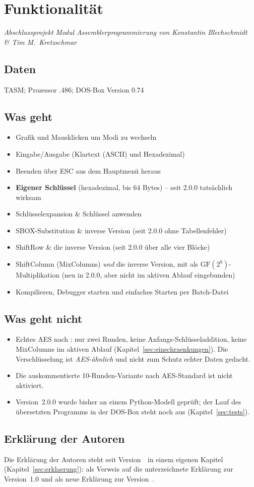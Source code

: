 \section{Funktionalität}\label{sec:funktionalitaet}
\textit{Abschlussprojekt Modul \glqq Assemblerprogrammierung\grqq{} von Konstantin Blechschmidt \& Tim M.\ Kretzschmar}

\subsection*{Daten}
TASM; Prozessor .486; DOS-Box Version 0.74

\subsection*{Was geht}
\begin{itemize}[noitemsep]
    \item Grafik und Mausklicken um Modi zu wechseln
    \item Eingabe/Ausgabe (Klartext (ASCII) und Hexadezimal)
    \item Beenden über \glqq ESC\grqq{} aus dem Hauptmenü heraus
    \item \textbf{Eigener Schlüssel} (hexadezimal, bis 64 Bytes) -- seit 2.0.0 tatsächlich wirksam
    \item Schlüsselexpansion \& Schlüssel anwenden
    \item SBOX-Substitution \& inverse Version (seit 2.0.0 ohne Tabellenfehler)
    \item ShiftRow \& die inverse Version (seit 2.0.0 über alle vier Blöcke)
    \item ShiftColumn (MixColumns) \emph{und} die inverse Version, mit  als $\mathrm{GF}(2^8)$-Multiplikation (neu in 2.0.0, aber nicht im aktiven Ablauf eingebunden)
    \item Kompilieren, Debugger starten und einfaches Starten per Batch-Datei
\end{itemize}

\subsection*{Was geht nicht}
\begin{itemize}[noitemsep]
    \item Echtes AES nach \cite{fips197}: nur zwei Runden, keine Anfangs-Schlüsseladdition, keine MixColumns im aktiven Ablauf (Kapitel~\ref{sec:einschraenkungen}). Die Verschlüsselung ist \emph{AES-ähnlich} und nicht zum Schutz echter Daten gedacht.
    \item Die auskommentierte 10-Runden-Variante nach AES-Standard ist nicht aktiviert.
    \item Version~2.0.0 wurde bisher an einem Python-Modell geprüft; der Lauf des übersetzten Programms in der DOS-Box steht noch aus (Kapitel~\ref{sec:tests}).
\end{itemize}

\subsection*{Erklärung der Autoren}
Die Erklärung der Autoren steht seit Version~\versionProjekt\ in einem eigenen Kapitel (Kapitel~\ref{sec:erklaerung}): als Verweis auf die unterzeichnete Erklärung zur Version~1.0 und als neue Erklärung zur Version~\versionProjekt.
